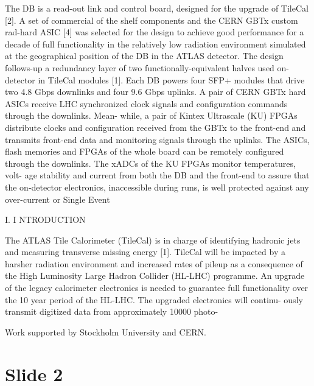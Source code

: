 \documentclass{article}
\begin{document}
The   DB   is   a   read-out   link   and   control   board,   designed   for 
the   upgrade   of   TileCal   [2].   A   set   of   commercial   of   the   shelf 
components   and   the   CERN   GBTx   custom   rad-hard   ASIC   [4] 
was   selected   for   the   design   to   achieve   good   performance   for 
a   decade   of   full   functionality   in   the   relatively   low   radiation 
environment   simulated   at   the   geographical   position   of   the   DB 
in   the   ATLAS   detector.   The   design   follows-up   a   redundancy 
layer   of   two   functionally-equivalent   halves   used   on-detector 
in   TileCal   modules   [1]. 
Each   DB   powers   four   SFP+   modules   that   drive   two   4.8 
Gbps   downlinks   and   four   9.6   Gbps   uplinks.   A   pair   of   CERN 
GBTx   hard   ASICs   receive   LHC   synchronized   clock   signals 
and   configuration   commands   through   the   downlinks.   Mean- 
while,   a   pair   of   Kintex   Ultrascale   (KU)   FPGAs   distribute 
clocks   and   configuration   received   from   the   GBTx   to   the 
front-end   and   transmits   front-end   data   and   monitoring   signals 
through   the   uplinks.   The   ASICs,   flash   memories   and   FPGAs 
of   the   whole   board   can   be   remotely   configured   through   the 
downlinks. 
The   xADCs   of   the   KU   FPGAs   monitor   temperatures,   volt- 
age   stability   and   current   from   both   the   DB   and   the   front-end 
to   assure   that   the   on-detector   electronics,   inaccessible   during 
runs, is well protected against any over-current or Single Event

I.   I NTRODUCTION

The   ATLAS   Tile   Calorimeter   (TileCal)   is   in   charge   of 
identifying   hadronic   jets   and   measuring   transverse   missing 
energy   [1].   TileCal   will   be   impacted   by   a   harsher   radiation 
environment   and   increased   rates   of   pileup   as   a   consequence 
of   the   High   Luminosity   Large   Hadron   Collider   (HL-LHC) 
programme.   An   upgrade   of   the   legacy   calorimeter   electronics 
is   needed   to   guarantee   full   functionality   over   the   10   year 
period of the HL-LHC. The upgraded electronics will continu- 
ously transmit digitized data from approximately 10000 photo-

Work   supported   by   Stockholm   University   and   CERN.

\section*{Slide 2}
\end{document}
